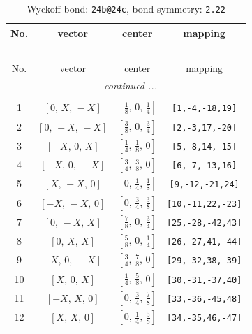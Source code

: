 \documentclass[fleqn,8pt]{jsarticle}
\begin{document}
\renewcommand{\arraystretch}{1.2}
\begin{longtable}{cccc}
\caption{Wyckoff bond: {\tt 24b@24c}, bond symmetry: {\tt 2.22}}
 \\
 \hline \hline
No. & vector & center & mapping \\ \hline \endfirsthead

\multicolumn{3}{l}{\tablename\ \thetable{}} \\
 \hline \hline
No. & vector & center & mapping \\ \hline \endhead

 \hline \hline
\multicolumn{3}{r}{\footnotesize\it continued ...} \\ \endfoot

 \hline \hline
\multicolumn{3}{r}{} \\ \endlastfoot

1 & $\left[ 0,\, X,\, - X \right]$ & $\left[ \frac{1}{8},\, 0,\, \frac{1}{4} \right]$ & {\tt [1,-4,-18,19]} \\ \hline
2 & $\left[ 0,\, - X,\, - X \right]$ & $\left[ \frac{3}{8},\, 0,\, \frac{3}{4} \right]$ & {\tt [2,-3,17,-20]} \\ \hline
3 & $\left[ - X,\, 0,\, X \right]$ & $\left[ \frac{1}{4},\, \frac{1}{8},\, 0 \right]$ & {\tt [5,-8,14,-15]} \\ \hline
4 & $\left[ - X,\, 0,\, - X \right]$ & $\left[ \frac{3}{4},\, \frac{3}{8},\, 0 \right]$ & {\tt [6,-7,-13,16]} \\ \hline
5 & $\left[ X,\, - X,\, 0 \right]$ & $\left[ 0,\, \frac{1}{4},\, \frac{1}{8} \right]$ & {\tt [9,-12,-21,24]} \\ \hline
6 & $\left[ - X,\, - X,\, 0 \right]$ & $\left[ 0,\, \frac{3}{4},\, \frac{3}{8} \right]$ & {\tt [10,-11,22,-23]} \\ \hline
7 & $\left[ 0,\, - X,\, X \right]$ & $\left[ \frac{7}{8},\, 0,\, \frac{3}{4} \right]$ & {\tt [25,-28,-42,43]} \\ \hline
8 & $\left[ 0,\, X,\, X \right]$ & $\left[ \frac{5}{8},\, 0,\, \frac{1}{4} \right]$ & {\tt [26,-27,41,-44]} \\ \hline
9 & $\left[ X,\, 0,\, - X \right]$ & $\left[ \frac{3}{4},\, \frac{7}{8},\, 0 \right]$ & {\tt [29,-32,38,-39]} \\ \hline
10 & $\left[ X,\, 0,\, X \right]$ & $\left[ \frac{1}{4},\, \frac{5}{8},\, 0 \right]$ & {\tt [30,-31,-37,40]} \\ \hline
11 & $\left[ - X,\, X,\, 0 \right]$ & $\left[ 0,\, \frac{3}{4},\, \frac{7}{8} \right]$ & {\tt [33,-36,-45,48]} \\ \hline
12 & $\left[ X,\, X,\, 0 \right]$ & $\left[ 0,\, \frac{1}{4},\, \frac{5}{8} \right]$ & {\tt [34,-35,46,-47]} \\
\end{longtable}
\end{document}
